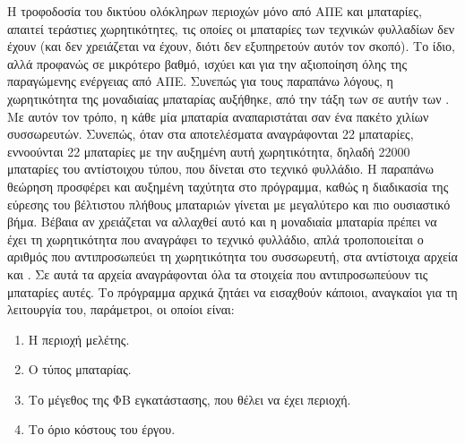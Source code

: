 \documentclass[12pt]{report}
\begin{document}
Η τροφοδοσία του δικτύου ολόκληρων περιοχών μόνο από ΑΠΕ και μπαταρίες, απαιτεί τεράστιες χωρητικότητες, τις οποίες οι μπαταρίες των τεχνικών φυλλαδίων δεν έχουν (και δεν χρειάζεται να
έχουν, διότι δεν εξυπηρετούν αυτόν τον σκοπό). Το ίδιο, αλλά προφανώς σε μικρότερο βαθμό, ισχύει και για την αξιοποίηση όλης της παραγώμενης ενέργειας από ΑΠΕ.
Συνεπώς για τους παραπάνω λόγους, η χωρητικότητα της μοναδιαίας μπαταρίας αυξήθηκε, από την τάξη των {} σε αυτήν των {}. Με αυτόν τον τρόπο, η κάθε μία μπαταρία αναπαριστάται
σαν ένα πακέτο χιλίων συσσωρευτών. Συνεπώς, όταν στα αποτελέσματα αναγράφονται 22 μπαταρίες, εννοούνται 22 μπαταρίες με την αυξημένη αυτή χωρητικότητα, δηλαδή 22000 μπαταρίες του αντίστοιχου τύπου, που δίνεται στο τεχνικό φυλλάδιο.
Η παραπάνω θεώρηση προσφέρει και αυξημένη ταχύτητα στο πρόγραμμα, καθώς η διαδικασία της εύρεσης του βέλτιστου πλήθους μπαταριών γίνεται με μεγαλύτερο και πιο ουσιαστικό βήμα. Βέβαια
αν χρειάζεται να αλλαχθεί αυτό και η μοναδιαία μπαταρία πρέπει να έχει τη χωρητικότητα που αναγράφει το τεχνικό φυλλάδιο, απλά τροποποιείται ο αριθμός που αντιπροσωπεύει τη χωρητικότητα
του συσσωρευτή, στα αντίστοιχα αρχεία {} και {}. Σε αυτά τα αρχεία αναγράφονται όλα τα στοιχεία που αντιπροσωπεύουν τις μπαταρίες αυτές.
Το πρόγραμμα αρχικά ζητάει να εισαχθούν κάποιοι, αναγκαίοι για τη λειτουργία του, παράμετροι, οι οποίοι είναι:

\begin{enumerate}[label=\roman*]
				\item Η περιοχή μελέτης.
				\item Ο τύπος μπαταρίας.
				\item Το μέγεθος της ΦΒ εγκατάστασης, που θέλει να έχει περιοχή.
				\item Το όριο κόστους του έργου.
\end{enumerate}
\end{document}
